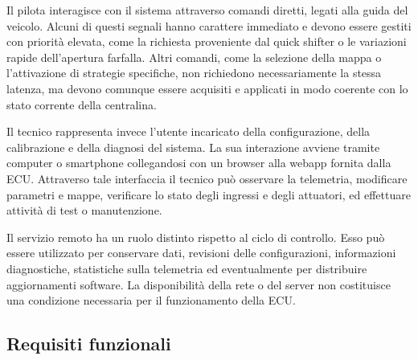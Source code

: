 \documentclass{article}
\begin{document}
Il pilota interagisce con il sistema attraverso comandi diretti, legati alla guida del veicolo. Alcuni di questi segnali hanno carattere immediato e devono essere gestiti con priorità elevata, come la richiesta proveniente dal quick shifter o le variazioni rapide dell'apertura farfalla. Altri comandi, come la selezione della mappa o l'attivazione di strategie specifiche, non richiedono necessariamente la stessa latenza, ma devono comunque essere acquisiti e applicati in modo coerente con lo stato corrente della centralina.

Il tecnico rappresenta invece l'utente incaricato della configurazione, della calibrazione e della diagnosi del sistema. La sua interazione avviene tramite computer o smartphone collegandosi con un browser alla webapp fornita dalla ECU. Attraverso tale interfaccia il tecnico può osservare la telemetria, modificare parametri e mappe, verificare lo stato degli ingressi e degli attuatori, ed effettuare attività di test o manutenzione.

Il servizio remoto ha un ruolo distinto rispetto al ciclo di controllo. Esso può essere utilizzato per conservare dati, revisioni delle configurazioni, informazioni diagnostiche, statistiche sulla telemetria ed eventualmente per distribuire aggiornamenti software. La disponibilità della rete o del server non costituisce una condizione necessaria per il funzionamento della ECU.

\subsection{Requisiti funzionali}
\end{document}
